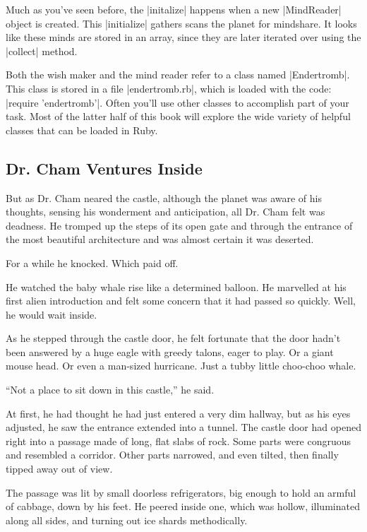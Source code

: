 \documentclass[12pt,twoside]{report}
\begin{document}
Much as you've seen before, the \rubyinline|initalize|
happens when a new \rubyinline|MindReader| object is
created. This \rubyinline|initialize| gathers scans
the planet for mindshare.  It looks like these minds are stored in an
array, since they are later iterated over using the
\rubyinline|collect| method.

Both the wish maker and the mind reader refer to a class named
\rubyinline|Endertromb|.  This class is stored in a
file \rubyinline|endertromb.rb|, which is loaded with
the code: \rubyinline|require 'endertromb'|. Often
you'll use other classes to accomplish part of your task.  Most of the
latter half of this book will explore the wide variety of helpful
classes that can be loaded in Ruby.



\subsection{Dr. Cham Ventures Inside}



But as Dr. Cham neared the castle, although the planet was aware of
his thoughts, sensing his wonderment and anticipation, all Dr. Cham
felt was deadness.  He tromped up the steps of its open gate and
through the entrance of the most beautiful architecture and was almost
certain it was deserted.

For a while he knocked.  Which paid off.


He watched the baby whale rise like a determined balloon.  He
marvelled at his first alien introduction and felt some concern that
it had passed so quickly.  Well, he would wait inside.

As he stepped through the castle door, he felt fortunate that the door
hadn't been answered by a huge eagle with greedy talons, eager to
play.  Or a giant mouse head.  Or even a man-sized hurricane.  Just a
tubby little choo-choo whale.

``Not a place to sit down in this castle,'' he said.

At first, he had thought he had just entered a very dim hallway, but
as his eyes adjusted, he saw the entrance extended into a tunnel.  The
castle door had opened right into a passage made of long, flat slabs
of rock.  Some parts were congruous and resembled a corridor.  Other
parts narrowed, and even tilted, then finally tipped away out of view.

The passage was lit by small doorless refrigerators, big enough to
hold an armful of cabbage, down by his feet.  He peered inside one,
which was hollow, illuminated along all sides, and turning out ice
shards methodically.
\end{document}
